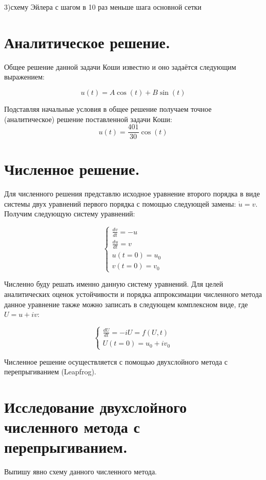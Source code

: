 \documentclass[diploma]{nanolab2015}
\begin{document}
 3)схему Эйлера с шагом в 10 раз меньше шага основной сетки 

\section{Аналитическое решение.}
Общее решение данной задачи Коши известно и оно задаётся следующим выражением:

$$u(t) = A \cos(t) + B \sin(t)$$ 

Подставляя начальные условия в общее решение получаем точное (аналитическое) решение поставленной задачи Коши:
$$u(t) = \frac{401}{30} \cos(t)$$ 

 \section{Численное решение.}
Для численного решения представлю исходное уравнение второго порядка в виде системы двух уравнений первого порядка с помощью следующей замены: $\dot u =v$. Получим следующую систему уравнений:
 
 \begin{equation*}
\begin{cases}
    \frac{d v}{d t} = - u\\
    \frac{d u}{d t} =  v\\
   u(t=0)=u_0\\
   v(t=0)= v_0
 \end{cases}
\end{equation*}

Численно буду решать именно данную систему уравнений. Для целей аналитических оценок устойчивости и порядка аппроксимации численного метода данное уравнение также можно записать в следующем комплексном виде, где $U = u + i v$:

\begin{equation*}
\begin{cases}
   \frac{d U}{d t} = -i U = f(U,t)\\
   U(t=0)=u_0 + i v_0
 \end{cases}
\end{equation*}

Численное решение осуществляется с помощью двухслойного метода с перепрыгиванием (Leapfrog).

\section{Исследование двухслойного численного метода с перепрыгиванием.}
Выпишу явно схему данного численного метода.
\end{document}
